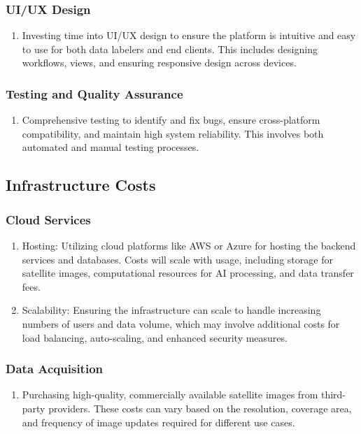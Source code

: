 \documentclass[12pt]{article}
\begin{document}
\subsubsection{UI/UX Design}
\begin{enumerate}
  \item Investing time into UI/UX design to ensure the platform is intuitive and easy to use for both data labelers and end clients. This includes designing workflows, views, and ensuring responsive design across devices.
  \end{enumerate}
  \subsubsection{Testing and Quality Assurance}
\begin{enumerate}
  \item Comprehensive testing to identify and fix bugs, ensure cross-platform compatibility, and maintain high system reliability. This involves both automated and manual testing processes.
  \end{enumerate}
\subsection{Infrastructure Costs}
\subsubsection{Cloud Services}
\begin{enumerate}
  \item Hosting: Utilizing cloud platforms like AWS or Azure for hosting the backend services and databases. Costs will scale with usage, including storage for satellite images, computational resources for AI processing, and data transfer fees.
  \item Scalability: Ensuring the infrastructure can scale to handle increasing numbers of users and data volume, which may involve additional costs for load balancing, auto-scaling, and enhanced security measures.
  \end{enumerate}
\subsubsection{Data Acquisition}
\begin{enumerate}
  \item Purchasing high-quality, commercially available satellite images from third-party providers. These costs can vary based on the resolution, coverage area, and frequency of image updates required for different use cases.
  \end{enumerate}
\end{document}
